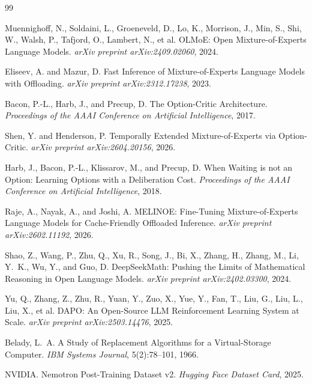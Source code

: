 \documentclass{article}
\begin{document}

\begin{thebibliography}{99}

Muennighoff, N., Soldaini, L., Groeneveld, D., Lo, K., Morrison, J., Min, S., Shi, W., Walsh, P., Tafjord, O., Lambert, N., et al.
\newblock OLMoE: Open Mixture-of-Experts Language Models.
\newblock \emph{arXiv preprint arXiv:2409.02060}, 2024.

Eliseev, A. and Mazur, D.
\newblock Fast Inference of Mixture-of-Experts Language Models with Offloading.
\newblock \emph{arXiv preprint arXiv:2312.17238}, 2023.

Bacon, P.-L., Harb, J., and Precup, D.
\newblock The Option-Critic Architecture.
\newblock \emph{Proceedings of the AAAI Conference on Artificial Intelligence}, 2017.

Shen, Y. and Henderson, P.
\newblock Temporally Extended Mixture-of-Experts via Option-Critic.
\newblock \emph{arXiv preprint arXiv:2604.20156}, 2026.

Harb, J., Bacon, P.-L., Klissarov, M., and Precup, D.
\newblock When Waiting is not an Option: Learning Options with a Deliberation Cost.
\newblock \emph{Proceedings of the AAAI Conference on Artificial Intelligence}, 2018.

Raje, A., Nayak, A., and Joshi, A.
\newblock MELINOE: Fine-Tuning Mixture-of-Experts Language Models for Cache-Friendly Offloaded Inference.
\newblock \emph{arXiv preprint arXiv:2602.11192}, 2026.

Shao, Z., Wang, P., Zhu, Q., Xu, R., Song, J., Bi, X., Zhang, H., Zhang, M., Li, Y.~K., Wu, Y., and Guo, D.
\newblock DeepSeekMath: Pushing the Limits of Mathematical Reasoning in Open Language Models.
\newblock \emph{arXiv preprint arXiv:2402.03300}, 2024.

Yu, Q., Zhang, Z., Zhu, R., Yuan, Y., Zuo, X., Yue, Y., Fan, T., Liu, G., Liu, L., Liu, X., et al.
\newblock DAPO: An Open-Source LLM Reinforcement Learning System at Scale.
\newblock \emph{arXiv preprint arXiv:2503.14476}, 2025.

Belady, L.~A.
\newblock A Study of Replacement Algorithms for a Virtual-Storage Computer.
\newblock \emph{IBM Systems Journal}, 5(2):78--101, 1966.

NVIDIA.
\newblock Nemotron Post-Training Dataset v2.
\newblock \emph{Hugging Face Dataset Card}, 2025.

\end{thebibliography}
\end{document}
